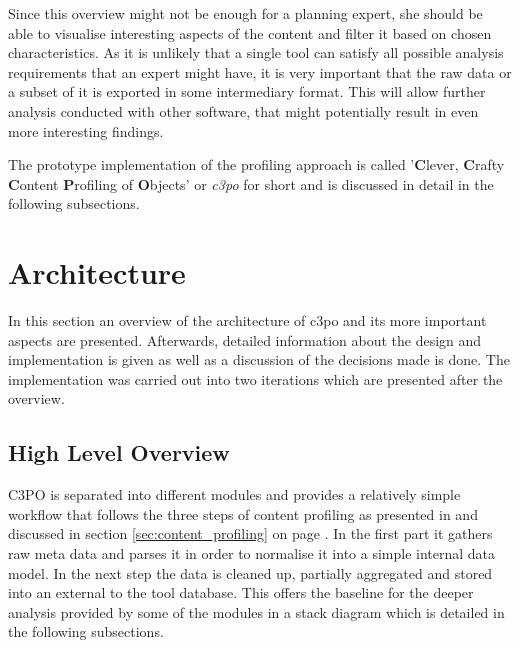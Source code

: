 Since this overview might not be enough for a planning expert, she should be able to visualise interesting aspects of the content and filter it based on chosen characteristics. As it is unlikely that a single tool can satisfy all possible analysis requirements that an expert might have, it is very important that the raw data or a subset of it is exported in some intermediary format. This will allow further analysis conducted with other software, that might potentially result in even more interesting findings. 


The prototype implementation of the profiling approach is called '\textbf{C}lever, \textbf{C}rafty \textbf{C}ontent \textbf{P}rofiling of \textbf{O}bjects' or \textit{c3po} for short and is discussed in detail in the following subsections.

\section{Architecture}
In this section an overview of the architecture of c3po and its more important aspects are presented. Afterwards, detailed information about the design and implementation is given as well as a discussion of the decisions made is done. The implementation was carried out into two iterations which are presented after the overview.

\subsection{High Level Overview}
C3PO is separated into different modules and provides a relatively simple workflow that follows the three steps of content profiling as presented in \cite{petrov-ipres2012} and discussed in section \ref{sec:content_profiling} on page \pageref{sec:content_profiling}. In the first part it gathers raw meta data and parses it in order to normalise it into a simple internal data model. In the next step the data is cleaned up, partially aggregated and stored into an external to the tool database.
This offers the baseline for the deeper analysis provided by some of the modules in a stack diagram which is detailed in the following subsections.


